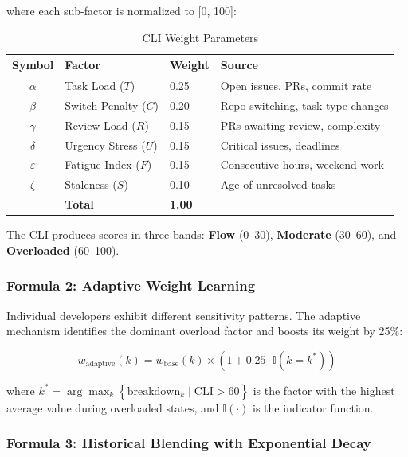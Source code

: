 \documentclass[12pt]{article}
\begin{document}
where each sub-factor is normalized to [0, 100]:

\begin{table}[H]
\centering
\caption{CLI Weight Parameters}
\label{tab:cli_weights}
\begin{tabular}{@{}clll@{}}
\toprule
\textbf{Symbol} & \textbf{Factor} & \textbf{Weight} & \textbf{Source} \\
\midrule
$\alpha$ & Task Load ($T$)           & 0.25 & Open issues, PRs, commit rate \\
$\beta$  & Switch Penalty ($C$)      & 0.20 & Repo switching, task-type changes \\
$\gamma$ & Review Load ($R$)         & 0.15 & PRs awaiting review, complexity \\
$\delta$ & Urgency Stress ($U$)      & 0.15 & Critical issues, deadlines \\
$\varepsilon$ & Fatigue Index ($F$)  & 0.15 & Consecutive hours, weekend work \\
$\zeta$  & Staleness ($S$)           & 0.10 & Age of unresolved tasks \\
\midrule
         & \textbf{Total}            & \textbf{1.00} & \\
\bottomrule
\end{tabular}
\end{table}

The CLI produces scores in three bands: \textbf{Flow} (0--30), \textbf{Moderate} (30--60), and \textbf{Overloaded} (60--100).

\subsubsection{Formula 2: Adaptive Weight Learning}

Individual developers exhibit different sensitivity patterns. The adaptive mechanism identifies the dominant overload factor and boosts its weight by 25\%:

\begin{equation}
w_{\text{adaptive}}(k) = w_{\text{base}}(k) \times \left(1 + 0.25 \cdot \mathbb{I}(k = k^*)\right)
\label{eq:adaptive}
\end{equation}

where $k^* = \arg\max_{k} \left\{ \overline{\text{breakdown}_k} \mid \text{CLI} > 60 \right\}$ is the factor with the highest average value during overloaded states, and $\mathbb{I}(\cdot)$ is the indicator function.

\subsubsection{Formula 3: Historical Blending with Exponential Decay}
\end{document}
